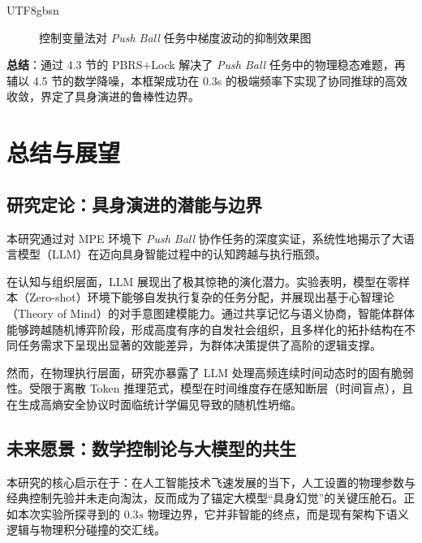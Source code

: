 \documentclass[11pt,a4paper]{article}
\begin{document}
\begin{CJK*}{UTF8}{gbsn}
\begin{figure}[H]
\caption{控制变量法对 \textit{Push Ball} 任务中梯度波动的抑制效果图}
\end{figure}



\noindent \textbf{总结}：通过 4.3 节的 PBRS+Lock 解决了 \textit{Push Ball} 任务中的物理稳态难题，再辅以 4.5 节的数学降噪，本框架成功在 0.3s 的极端频率下实现了协同推球的高效收敛，界定了具身演进的鲁棒性边界。

\section{总结与展望}

\subsection{研究定论：具身演进的潜能与边界}
本研究通过对 MPE 环境下 \textit{Push Ball} 协作任务的深度实证，系统性地揭示了大语言模型（LLM）在迈向具身智能过程中的认知跨越与执行瓶颈。

在认知与组织层面，LLM 展现出了极其惊艳的演化潜力。实验表明，模型在零样本（Zero-shot）环境下能够自发执行复杂的任务分配，并展现出基于心智理论（Theory of Mind）的对手意图建模能力。通过共享记忆与语义协商，智能体群体能够跨越随机博弈阶段，形成高度有序的自发社会组织，且多样化的拓扑结构在不同任务需求下呈现出显著的效能差异，为群体决策提供了高阶的逻辑支撑。

然而，在物理执行层面，研究亦暴露了 LLM 处理高频连续时间动态时的固有脆弱性。受限于离散 Token 推理范式，模型在时间维度存在感知断层（时间盲点），且在生成高熵安全协议时面临统计学偏见导致的随机性坍缩。



\subsection{未来愿景：数学控制论与大模型的共生}
本研究的核心启示在于：在人工智能技术飞速发展的当下，人工设置的物理参数与经典控制先验并未走向淘汰，反而成为了锚定大模型“具身幻觉”的关键压舱石。正如本次实验所探寻到的 $0.3s$ 物理边界，它并非智能的终点，而是现有架构下语义逻辑与物理积分碰撞的交汇线。


\end{CJK*}
\end{document}
